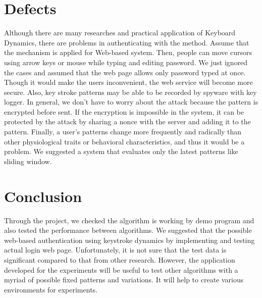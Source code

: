 \documentclass[twocolumn,showpacs,%
  nofootinbib,aps,%
  eqsecnum,prd,notitlepage,showkeys,10pt]{revtex4-1}
\begin{document}
\section{Defects}
Although there are many researches and practical application of Keyboard Dynamics, there are problems in authenticating with the method. Assume that the mechanism is applied for Web-based system. Then, people can move cursors using arrow keys or mouse while typing and editing password. We just ignored the cases and assumed that the web page allows only password typed at once. Though it would make the users inconvenient, the web service will become more secure. Also, key stroke patterns may be able to be recorded by spyware with key logger. In general, we don't have to worry about the attack because the pattern is encrypted before sent. If the encryption is impossible in the system, it can be protected by the attack by sharing a nonce with the server and adding it to the pattern. Finally, a user's patterns change more frequently and radically than other physiological traits or behavioral characteristics, and thus it would be a problem. We suggested a system that evaluates only the latest patterns like sliding window.

\section{Conclusion}
Through the project, we checked the algorithm is working by demo program and also tested the performance between algorithms. We suggested that the possible web-based authentication using keystroke dynamics by implementing and testing actual login web page. Unfortunately, it is not sure that the test data is significant compared to that from other research. However, the application developed for the experiments will be useful to test other algorithms with a myriad of possible fixed patterns and variations. It will help to create various environments for experiments.



\end{document}
